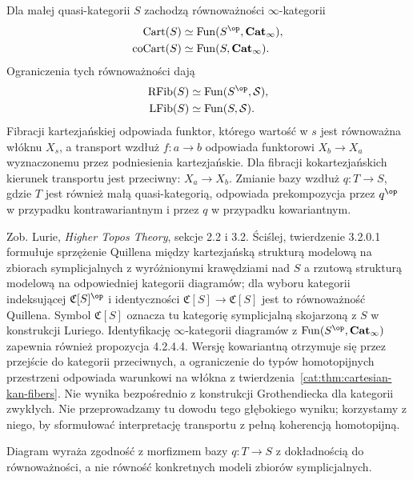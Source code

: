 \begin{twierdzenie}\label{cat:thm:straightening-unstraightening}
Dla małej quasi-kategorii $S$ zachodzą równoważności $\infty$-kategorii
\[
\begin{aligned}
 \operatorname{Cart}(S)&\simeq\operatorname{Fun}(S^{\op},\mathbf{Cat}_{\infty}),\\
 \operatorname{coCart}(S)&\simeq\operatorname{Fun}(S,\mathbf{Cat}_{\infty}).
\end{aligned}
\]
Ograniczenia tych równoważności dają
\[
\begin{aligned}
 \operatorname{RFib}(S)&\simeq\operatorname{Fun}(S^{\op},\mathcal S),\\
 \operatorname{LFib}(S)&\simeq\operatorname{Fun}(S,\mathcal S).
\end{aligned}
\]
Fibracji kartezjańskiej odpowiada funktor, którego wartość w $s$ jest równoważna włóknu $X_s$, a transport wzdłuż $f:a\to b$ odpowiada funktorowi $X_b\to X_a$ wyznaczonemu przez podniesienia kartezjańskie. Dla fibracji kokartezjańskich kierunek transportu jest przeciwny: $X_a\to X_b$. Zmianie bazy wzdłuż $q:T\to S$, gdzie $T$ jest również małą quasi-kategorią, odpowiada prekompozycja przez $q^{\op}$ w przypadku kontrawariantnym i przez $q$ w przypadku kowariantnym.
\end{twierdzenie}
Zob. Lurie, \emph{Higher Topos Theory}, sekcje 2.2 i 3.2. Ściślej, twierdzenie 3.2.0.1 formułuje sprzężenie Quillena między kartezjańską strukturą modelową na zbiorach symplicjalnych z wyróżnionymi krawędziami nad $S$ a rzutową strukturą modelową na odpowiedniej kategorii diagramów; dla wyboru kategorii indeksującej $\mathfrak C[S]^{\op}$ i identyczności $\mathfrak C[S]\to\mathfrak C[S]$ jest to równoważność Quillena. Symbol $\mathfrak C[S]$ oznacza tu kategorię symplicjalną skojarzoną z $S$ w konstrukcji Luriego. Identyfikację $\infty$-kategorii diagramów z $\operatorname{Fun}(S^{\op},\mathbf{Cat}_{\infty})$ zapewnia również propozycja 4.2.4.4. Wersję kowariantną otrzymuje się przez przejście do kategorii przeciwnych, a ograniczenie do typów homotopijnych przestrzeni odpowiada warunkowi na włókna z twierdzenia~\ref{cat:thm:cartesian-kan-fibers}. Nie wynika bezpośrednio z konstrukcji Grothendiecka dla kategorii zwykłych. Nie przeprowadzamy tu dowodu tego głębokiego wyniku; korzystamy z niego, by sformułować interpretację transportu z pełną koherencją homotopijną.

\begin{center}
\end{center}
Diagram wyraża zgodność z morfizmem bazy $q:T\to S$ z dokładnością do równoważności, a nie równość konkretnych modeli zbiorów symplicjalnych.

